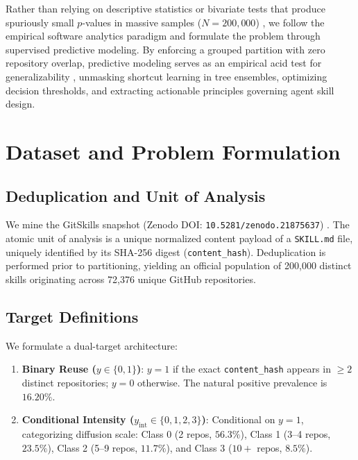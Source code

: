 \documentclass[10pt,conference]{IEEEtran}
\begin{document}
Rather than relying on descriptive statistics or bivariate tests that produce spuriously small $p$-values in massive samples ($N=200,000$) \cite{lin2013too}, we follow the empirical software analytics paradigm \cite{menzies2010defect,tantithamthavorn2020code} and formulate the problem through supervised predictive modeling. By enforcing a grouped partition with zero repository overlap, predictive modeling serves as an empirical acid test for generalizability \cite{shmueli2010explain,breiman2001statistical}, unmasking shortcut learning in tree ensembles, optimizing decision thresholds, and extracting actionable principles governing agent skill design.

\section{Dataset and Problem Formulation}

\subsection{Deduplication and Unit of Analysis}
We mine the GitSkills snapshot (Zenodo DOI: \texttt{10.5281/zenodo.21875637}) \cite{gitskills2027}. The atomic unit of analysis is a unique normalized content payload of a \texttt{SKILL.md} file, uniquely identified by its SHA-256 digest (\texttt{content\_hash}). Deduplication is performed prior to partitioning, yielding an official population of 200,000 distinct skills originating across 72,376 unique GitHub repositories.

\subsection{Target Definitions}
We formulate a dual-target architecture:
\begin{enumerate}
    \item \textbf{Binary Reuse ($y \in \{0, 1\}$)}: $y = 1$ if the exact \texttt{content\_hash} appears in $\ge 2$ distinct repositories; $y = 0$ otherwise. The natural positive prevalence is $16.20\%$.
    \item \textbf{Conditional Intensity ($y_{\text{int}} \in \{0, 1, 2, 3\}$)}: Conditional on $y=1$, categorizing diffusion scale: Class 0 (2 repos, $56.3\%$), Class 1 (3--4 repos, $23.5\%$), Class 2 (5--9 repos, $11.7\%$), and Class 3 ($10+$ repos, $8.5\%$).
\end{enumerate}
\end{document}
